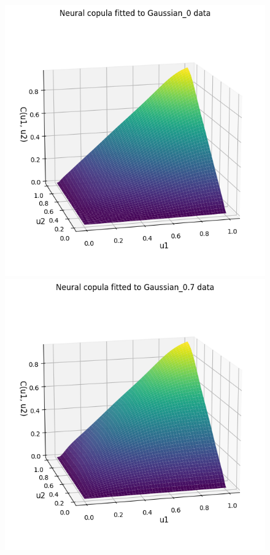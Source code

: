 \documentclass[%
a4paper,							
11pt,								
bibliography=totoc,						
abstracton=true					
]
{scrartcl}
\theoremstyle{plain}
\theoremstyle{definition}
\theoremstyle{remark}
\newcommand{\1}{\mathbbm{1}}
\begin{document}
\begin{figure}[H]
    \centering
    \begin{minipage}{0.49\textwidth}
        \centering
        \includegraphics[width=\textwidth]{5ResultsDiscussion/pictures/PortfolioTest/NCPort1.png}
    \end{minipage}
    \hfill
    \begin{minipage}{0.49\textwidth}
        \centering
        \includegraphics[width=\textwidth]{5ResultsDiscussion/pictures/PortfolioTest/NCPort2.png}

\end{minipage}
\end{figure}
\end{document}
